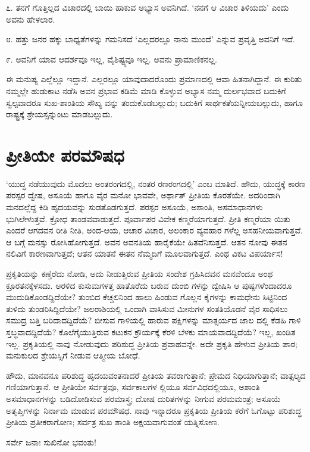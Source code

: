 ೭. ತನಗೆ ಗೊತ್ತಿಲ್ಲದ ವಿಚಾರದಲ್ಲಿ ಬಾಯಿ ಹಾಕುವ ಅಭ್ಯಾಸ ಅವನಿಗಿದೆ. ‘ನನಗೆ ಆ ವಿಚಾರ ತಿಳಿಯದು’ ಎಂದು ಅವನು ಹೇಳಲಾರ.

೮. ಹತ್ತು ಜನರ ಹಕ್ಕು ಬಾಧ್ಯತೆಗಳನ್ನು ಗಮನಿಸದೆ ‘ಎಲ್ಲದರಲ್ಲೂ ನಾನು ಮುಂದೆ’ ಎನ್ನುವ ಪ್ರವೃತ್ತಿ ಅವನಿಗೆ ಇದೆ.

೯. ಅವನಿಗೆ ಯಾವ ಆದರ್ಶವೂ ಇಲ್ಲ, ವೈಶಿಷ್ಟ್ಯವೂ ಇಲ್ಲ. ಅವನು ಪ್ರಾಮಾಣಿಕನಲ್ಲ.

ಈ ಮನುಷ್ಯ ಎಲ್ಲೆಲ್ಲೂ ಇದ್ದಾನೆ. ಎಲ್ಲರಲ್ಲೂ ಯಾವುದಾದರೊಂದು ಪ್ರಮಾಣದಲ್ಲಿ ಆವಾ ಹಿತನಾಗಿದ್ದಾನೆ. ಈ ಕುರಿತು ನಮ್ಮಲ್ಲೇ ಹುಡುಕಾಟ ನಡೆಸಿ ಅವನ ಪ್ರಭಾವ ಕಡಿಮೆ ಮಾಡಿ ಕೊಳ್ಳುವ ಅಭ್ಯಾಸ ನಮ್ಮ ದುರ್ಲಭವಾದ ಬದುಕಿಗೆ ಸ್ವಲ್ಪವಾದರೂ ಸುಖ-ಶಾಂತಿಯ ಸೌಖ್ಯ ವನ್ನು ತಂದುಕೊಡಬಲ್ಲುದು; ಬದುಕಿಗೆ ಸಾರ್ಥಕತೆಯನ್ನೀಯಬಲ್ಲುದು, ಹಾಗೂ ರಾಷ್ಟ್ರಕ್ಕೆ ಶ್ರೇಯಸ್ಸನ್ನುಂಟು ಮಾಡಬಲ್ಲುದು.


\section{ಪ್ರೀತಿಯೇ ಪರಮೌಷಧ}

‘ಯುದ್ಧ ನಡೆಯುವುದು ಮೊದಲು ಅಂತರಂಗದಲ್ಲಿ, ನಂತರ ರಣರಂಗದಲ್ಲಿ’ ಎಂಬ ಮಾತಿದೆ. ಹೌದು, ಯುದ್ಧಕ್ಕೆ ಕಾರಣ ಪರಸ್ಪರ ದ್ವೇಷ, ಅಸೂಯೆ ಹಾಗೂ ವೈರ ಮನೋ ಭಾವವೇ, ಅರ್ಥಾತ್ ಪ್ರೀತಿಯ ಕೊರತೆಯೇ. ಅದರಿಂದಾಗಿ ಮನದಲ್ಲೆದ್ದ ಕಿಡಿ ಹೃದಯವನ್ನು ಸುಡತೊಡಗುತ್ತದೆ. ಪರಸ್ಪರ ಅಸೂಯೆ, ಅಶಾಂತಿ, ಅಸಮಾಧಾನಗಳು ಭುಗಿಲೇಳುತ್ತವೆ. ಕ್ರೋಧ ತಾಂಡವವಾಡುತ್ತದೆ. ಪೂರ್ವಾಪರ ವಿವೇಕ ಕಣ್ಮರೆಯಾಗುತ್ತದೆ. ಪ್ರೀತಿ ಕಣ್ಮರೆಯಾ ಯಿತು ಎಂದರೆ ಆಗದವನ ರೀತಿ ನೀತಿ, ಅಂದ-ಆಯ, ಆಚಾರ ವಿಚಾರ, ಅಲಂಕಾರ ವ್ಯವಹಾರ ಗಳೆಲ್ಲ ಅಸಹನೀಯವಾಗುತ್ತವೆ. ಆ ಬಗ್ಗೆ ಮನಸ್ಸು ರೋಸಿಹೋಗುತ್ತದೆ. ಅವನ ಅವನತಿಯ ಹಾರೈಕೆಯೇ ಹಿತವೆನಿಸುತ್ತದೆ. ಆತನ ನೋವು ಈತನ ನಲಿವಿಗೆ ಕಾರಣವಾಗುತ್ತದೆ; ಆತನ ಯಾತನೆ ಈತನ ನೆಮ್ಮದಿಗೆ ಮೂಲವಾಗುತ್ತದೆ. ಎಂಥ ವಿಕಟ ವಿಪರ್ಯಾಸ!

ಪ್ರಕೃತಿಯನ್ನು ಕಣ್ತೆರೆದು ನೋಡಿ, ಅದು ನೀಡುತ್ತಿರುವ ಪ್ರೀತಿಯ ಸಂದೇಶ ಗ್ರಹಿಸಿದವನ ಮನವೆಂದೂ ಅಂಥ ಕ್ರೂರತನಕ್ಕೆಳಸದು. ಅರಳಿದ ಕುಸುಮಗಳತ್ತ ಹಾತೊರೆದು ಬರುವ ದುಂಬಿ ಗಳನ್ನು ದ್ವೇಷಿಸಿ ಆ ಪುಷ್ಪಗಳೆಂದಾದರೂ ಮುದುಡಿಕೊಂಡದ್ದಿದೆಯೇ? ತುಂಬಿದ ಕೆಚ್ಚಲಿನಿಂದ ಹಾಲು ಹಿಂಡುವ ಗೊಲ್ಲನ ಕೈಗಳನ್ನು ಕಾಮಧೇನು ಸಿಟ್ಟಿನಿಂದ ತುಳಿದು ತುಂಡರಿಸಿದ್ದಿದೆಯೇ? ಜಲರಾಶಿಯಲ್ಲಿ ಒಂದಾಗಿ ವಾಸಿಸುವ ಮೀನುಗಳ ಸಂತತಿಯೊಡನೆ ವೈರ ಸಾಧಿಸಲು ಸಮುದ್ರ ಬತ್ತಿ ಬರಿದಾದದ್ದಿದೆಯೆ? ಬೀಸುವ ಗಾಳಿಯಲ್ಲಿ ಹಾರುವ ಪಕ್ಷಿಗಳನ್ನು ಮಾತ್ಸರ್ಯದ ಜಾಲ ದಲ್ಲಿ ಕೆಡಹಿ ಗಾಳಿ ಸ್ತಬ್ಧವಾದದ್ದಿದೆಯೆ? ಕೊಲೆಗೈಯುತ್ತಿರುವ ಕಟುಕನ ಕ್ರೌರ್ಯಕ್ಕೆ ಕೆರಳಿ ಬೆಳಕು ಮಾಯವಾದದ್ದಿದೆಯೆ? ಇಲ್ಲ, ಖಂಡಿತ ಇಲ್ಲ. ಪ್ರಕೃತಿಯಲ್ಲಿ ನಾವು ನೋಡುವುದು ಪರಿಶುದ್ಧ ಪ್ರೀತಿಯ ಪ್ರವಾಹವನ್ನೇ. ಅದೇ ಪ್ರಕೃತಿ ಹೇಳುವ ಪ್ರೀತಿಯ ಪಾಠ; ಮನುಕುಲದ ಶ್ರೇಯಸ್ಸಿಗೆ ನೀಡುವ ಆತ್ಮೀಯ ಬೋಧೆ.

ಹೌದು, ಮಾನವನೂ ಪರಿಶುದ್ಧ ಹೃದಯವಂತನಾದರೆ ಪ್ರೀತಿಯ ತವರಾಗುತ್ತಾನೆ; ಪ್ರೇಮದ ನಿಧಿಯಾಗುತ್ತಾನೆ; ವಾತ್ಸಲ್ಯದ ಗಣಿಯಾಗುತ್ತಾನೆ. ಆ ಪ್ರೀತಿಯೇ ಸರ್ವತ್ರವೂ, ಸರ್ವಕಾಲಗಳ ಲ್ಲಿಯೂ ಸರ್ವವಿಧದಲ್ಲಿಯೂ, ಅಶಾಂತಿ ಅಸಮಾಧಾನಗಳನ್ನು ಬಡಿದೋಡಿಸುವ ಪರಮಾಸ್ತ್ರ; ದೋಷ ದುರಿತಗಳನ್ನು ನೀಗುವ ಪರಮಮಂತ್ರ; ಅಸೂಯೆ ಅತೃಪ್ತಿಗಳನ್ನು ನಿರ್ನಾಮ ಮಾಡುವ ಪರಮೌಷಧ. ನಾವು ಇನ್ನಾದರೂ ಪ್ರಕೃತಿಯ ಪ್ರೀತಿಯ ಕರೆಗೆ ಓಗೊಟ್ಟು ಪರಿಶುದ್ಧ ಪ್ರೀತಿಯ ಪ್ರತೀಕರಾಗೋಣ; ಸರ್ವತ್ರ ಸುಖ ಶಾಂತಿ ಅಕ್ಷಯವಾಗುವಂತೆ ಯತ್ನಿಸೋಣ.

ಸರ್ವೇ ಜನಾಃ ಸುಖಿನೋ ಭವಂತು!


